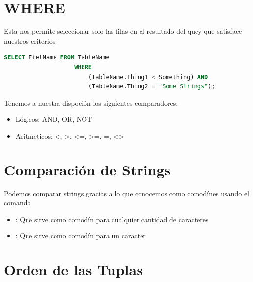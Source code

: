 \documentclass[12pt, fleqn]{report}                             %
\newcommand \Quote              {\qq}                           %
\theoremstyle{break}                                            %
\begin{document}
        \clearpage
        \section{WHERE}

            Esta nos permite seleccionar solo las filas en el resultado del quey
            que satisface nuestros criterios.

            \begin{lstlisting}[language=SQL, gobble=16]
                SELECT FielName FROM TableName
                    WHERE
                        (TableName.Thing1 < Something) AND
                        (TableName.Thing2 = "Some Strings");
            \end{lstlisting}

            Tenemos a nuestra dispoción los siguientes comparadores:
            \begin{itemize}
                \item Lógicos: AND, OR, NOT
                \item Aritmeticos: <, >, <=, >=, =, <>
            \end{itemize}



        \section{Comparación de Strings}
            
            Podemos comparar strings gracias a lo que conocemos como comodínes usando
            el comando \Quote{LIKE}
            \begin{itemize}
                \item \Quote{\%}: Que sirve como comodín para cualquier cantidad de caracteres 
                \item \Quote{\_}: Que sirve como comodín para un caracter 
            \end{itemize}


        \section{Orden de las Tuplas}
\end{document}
